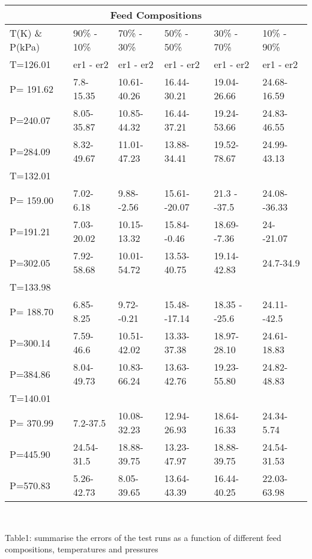 \documentclass[12pt,a4paper,oneside]{report}%
\begin{document}
\centering
\begin{landscape}

\begin{tabular}{ |p{3cm}||p{3cm}|p{3cm}|p{3cm}|p{3cm}|p{3cm}|  }
 \hline
 \multicolumn{6}{|c|}{Feed Compositions} \\
 \hline
 T(K) \& P(kPa)& 90\% - 10\% & 70\% - 30\% & 50\% - 50\% & 30\% - 70\% &10\% - 90\%\\
 \hline
  T=126.01 & er1 - er2 & er1 - er2 & er1 - er2 & er1 - er2 & er1 - er2 \\
 P= 191.62 & 7.8-15.35 & 10.61-40.26 & 16.44-30.21 & 19.04-26.66 & 24.68-16.59 \\   
 P=240.07 & 8.05-35.87 & 10.85-44.32 & 16.44-37.21 & 19.24-53.66 & 24.83-46.55\\
 P=284.09 & 8.32-49.67 & 11.01-47.23 & 13.88-34.41 & 19.52-78.67 & 24.99-43.13\\
 \hline
 T=132.01 & & & & & \\
 P= 159.00 & 7.02-6.18 & \cellcolor[HTML]{AA0550}9.88- -2.56 & 15.61- -20.07 & 21.3 - -37.5 & 24.08- -36.33 \\   
 P=191.21 & 7.03-20.02 & 10.15-13.32 & 15.84- -0.46 & 18.69- -7.36 & 24- -21.07\\
 P=302.05 & 7.92-58.68 & 10.01-54.72 & 13.53-40.75 & 19.14-42.83 & 24.7-34.9\\
 \hline
 T=133.98 & & & & & \\
 P= 188.70 & 6.85-8.25 & 9.72- -0.21 & 15.48- -17.14 & 18.35 - -25.6 & 24.11- -42.5 \\   
 P=300.14 & 7.59-46.6 & 10.51-42.02  & 13.33-37.38 & 18.97- 28.10 & 24.61-18.83 \\
 P=384.86 & 8.04-49.73 & 10.83-66.24 & 13.63-42.76 & 19.23-55.80 & 24.82-48.83\\
 \hline
 T=140.01 & & & & & \\
 P= 370.99 & 7.2-37.5 & 10.08-32.23 & 12.94-26.93 & 18.64-16.33 & 24.34-5.74 \\   
 P=445.90 & 24.54-31.5 & 18.88-39.75 & 13.23-47.97 & 18.88- 39.75 & 24.54-31.53 \\
 P=570.83 & 5.26-42.73 & 8.05-39.65 & 13.64-43.39 & 16.44-40.25 & \cellcolor[HTML]{AA0550}22.03-63.98\\
 \hline
  \end{tabular}\\
\center   
\caption{Table1: summarise the errors of the test runs as a function of different feed compositions, temperatures and pressures}\label{table1:errors}

\end{landscape}
\end{document}

